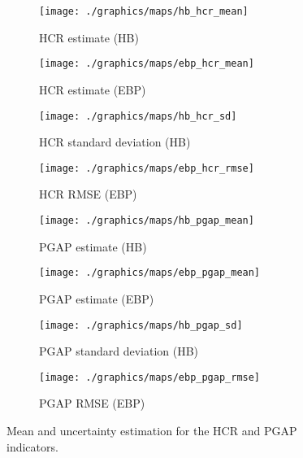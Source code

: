 \begin{figure}
    \begin{subfigure}{0.49\linewidth}
        \centering
        \texttt{[image: ./graphics/maps/hb\_hcr\_mean]}
        \caption{HCR estimate (HB)}
    \end{subfigure}
    \begin{subfigure}{0.49\linewidth}
        \centering
        \texttt{[image: ./graphics/maps/ebp\_hcr\_mean]}
        \caption{HCR estimate (EBP)}
    \end{subfigure}

    \begin{subfigure}{0.49\linewidth}
        \centering
        \texttt{[image: ./graphics/maps/hb\_hcr\_sd]}
        \caption{HCR standard deviation (HB)}
    \end{subfigure}
    \begin{subfigure}{0.49\linewidth}
        \centering
        \texttt{[image: ./graphics/maps/ebp\_hcr\_rmse]}
        \caption{HCR RMSE (EBP)}
    \end{subfigure}

    \begin{subfigure}{0.49\linewidth}
        \centering
        \texttt{[image: ./graphics/maps/hb\_pgap\_mean]}
        \caption{PGAP estimate (HB)}
    \end{subfigure}
    \begin{subfigure}{0.49\linewidth}
        \centering
        \texttt{[image: ./graphics/maps/ebp\_pgap\_mean]}
        \caption{PGAP estimate (EBP)}
    \end{subfigure}

    \begin{subfigure}{0.49\linewidth}
        \centering
        \texttt{[image: ./graphics/maps/hb\_pgap\_sd]}
        \caption{PGAP standard deviation (HB)}
    \end{subfigure}
    \begin{subfigure}{0.49\linewidth}
        \centering
        \texttt{[image: ./graphics/maps/ebp\_pgap\_rmse]}
        \caption{PGAP RMSE (EBP)}
    \end{subfigure}
    \caption{Mean and uncertainty estimation for the HCR and PGAP indicators.}
    \label{fig:maps}
\end{figure}

